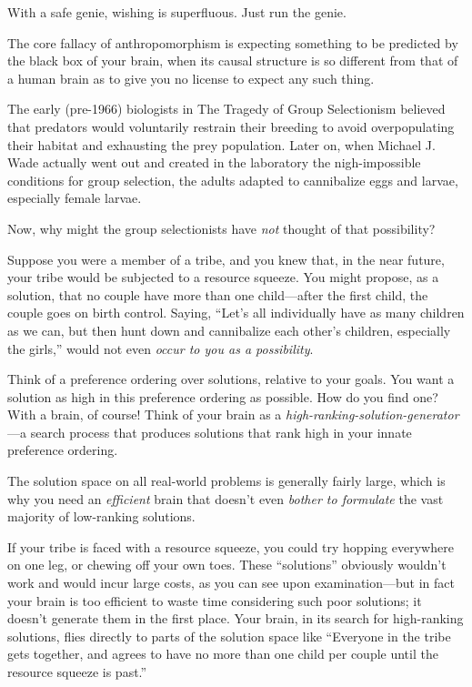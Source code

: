 {
 With a safe genie, wishing is superfluous. Just run the genie.}

\myendsectiontext


{
 The core fallacy of anthropomorphism is expecting something to be
predicted by the black box of your brain, when its causal structure is
so different from that of a human brain as to give you no license to
expect any such thing. }

{
 The early (pre-1966) biologists in The Tragedy of Group
Selectionism believed that predators would voluntarily restrain their
breeding to avoid overpopulating their habitat and exhausting the prey
population. Later on, when Michael J. Wade actually went out and
created in the laboratory the nigh-impossible conditions for group
selection, the adults adapted to cannibalize eggs and larvae,
especially female larvae.}

{
 Now, why might the group selectionists have \textit{not} thought
of that possibility?}

{
 Suppose you were a member of a tribe, and you knew that, in the
near future, your tribe would be subjected to a resource squeeze. You
might propose, as a solution, that no couple have more than one
child---after the first child, the couple goes on birth control.
Saying, ``Let's all individually have
as many children as we can, but then hunt down and cannibalize each
other's children, especially the
girls,'' would not even \textit{occur to you as a
possibility}.}

{
 Think of a preference ordering over solutions, relative to your
goals. You want a solution as high in this preference ordering as
possible. How do you find one? With a brain, of course! Think of your
brain as a \textit{high-ranking-solution-generator}{}---a search
process that produces solutions that rank high in your innate
preference ordering.}

{
 The solution space on all real-world problems is generally fairly
large, which is why you need an \textit{efficient} brain that
doesn't even \textit{bother to formulate} the vast
majority of low-ranking solutions.}

{
 If your tribe is faced with a resource squeeze, you could try
hopping everywhere on one leg, or chewing off your own toes. These
``solutions'' obviously
wouldn't work and would incur large costs, as you can
see upon examination---but in fact your brain is too efficient to waste
time considering such poor solutions; it doesn't
generate them in the first place. Your brain, in its search for
high-ranking solutions, flies directly to parts of the solution space
like ``Everyone in the tribe gets together, and agrees
to have no more than one child per couple until the resource squeeze is
past.''}

